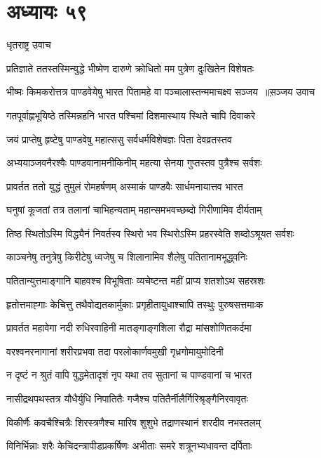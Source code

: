 \chapter{अध्यायः ५९}
\twolineshloka
{धृतराष्ट्र उवाच}
{}


\twolineshloka
{प्रतिज्ञाते ततस्तस्मिन्युद्धे भीष्मेण दारुणे}
{क्रोधितो मम पुत्रेण दुःखितेन विशेषतः}


\threelineshloka
{भीष्मः किमकरोत्तत्र पाण्डवेयेषु भारत}
{पितामहे वा पञ्चालास्तन्ममाचक्ष्व सञ्जय ॥स़ञ्जय उवाच}
{}


\twolineshloka
{गतपूर्वाह्णभूयिष्ठे तस्मिन्नहनि भारत}
{पश्चिमां दिशमास्थाय स्थिते चापि दिवाकरे}


\twolineshloka
{जयं प्राप्तेषु हृष्टेषु पाण्डवेषु महात्ससु}
{सर्वधर्मविशेषज्ञः पिता देवव्रतस्तव}


\twolineshloka
{अभ्ययाञ्जवनैरश्वैः पाण्डवानामनीकिनीम्}
{महत्या सेनया गुप्तस्तव पुत्रैश्च सर्वशः}


\twolineshloka
{प्रावर्तत ततो युद्धं तुमुलं रोमहर्षणम्}
{अस्माकं पाण्डवैः सार्धमनायात्तव भारत}


\twolineshloka
{घनुषां कूजतां तत्र तलानां चाभिहन्यताम्}
{महान्समभवच्छब्दो गिरीणामिव दीर्यताम्}


\twolineshloka
{तिष्ठ स्थितोऽस्मि विद्ध्यैनं निवर्तस्व स्थिरो भव}
{स्थिरोऽस्मि प्रहरस्वेति शब्दोऽश्रूयत सर्वशः}


\twolineshloka
{काञ्चनेषु तनुत्रेषु किरीटेषु ध्वजेषु च}
{शिलानामिव शैलेषु पतितानामभूद्ध्वनिः}


\twolineshloka
{पतितान्युत्तमाङ्गानि बाहवश्च विभूषिताः}
{व्यचेष्टन्त महीं प्राप्य शतशोऽथ सहस्रशः}


\twolineshloka
{हृतोत्तमाह्गाः केचित्तु तथैवोद्यतकार्मुकाः}
{प्रगृहीतायुधाश्चापि तस्थुः पुरुषसत्तमाःक}


\twolineshloka
{प्रावर्तत महावेगा नदी रुधिरवाहिनी}
{मातङ्गाङ्गशिला रौद्रा मांसशोणितकर्दमा}


\twolineshloka
{वरश्वनरनागानां शरीरप्रभवा तदा}
{परलोकार्णवमुखी गृध्रगोमायुमोदिनी}


\twolineshloka
{न दृष्टं न श्रुतं वापि युद्धमेतादृशं नृप}
{यथा तव सुतानां च पाण्डवानां च भारत}


\twolineshloka
{नासीद्रथपथस्तत्र यौधैर्युधि निपातितैः}
{गजैश्च पतितैर्नीलैर्गिरिश्रृङ्गैनिरवावृतः}


\twolineshloka
{विकीर्णैः कवचैश्चित्रैः शिरस्त्रणैश्च मारिष}
{शुशुभे तद्राणस्थानं शरदीव नभस्तलम्}


\twolineshloka
{विनिर्भिन्नाः शरैः केचिदन्त्रापीडप्रकर्षिणः}
{अभीताः समरे शत्रूनभ्यधावन्त दर्पिताः}


